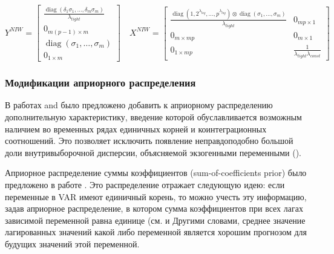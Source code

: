 \documentclass[11pt]{article} %
\DeclareMathOperator{\diag}{diag}
\begin{document}
\begin{equation}
Y^{NIW}=\begin{bmatrix}
\frac{\diag(\delta_1\sigma_1,\ldots, \delta_m\sigma_m)}{\lambda_{tight}}\\
0_{m(p-1)\times m}\\
\diag(\sigma_1,\ldots,\sigma_m)\\
0_{1\times m}
\end{bmatrix}
\quad
%
X^{NIW}=\begin{bmatrix}
\frac{\diag(1,2^{\lambda_{lag}},\ldots, p^{\lambda_{lag}})\otimes \diag(\sigma_1,\ldots,\sigma_m)}{\lambda_{tight}} & 0_{mp\times 1} \\
0_{m\times mp}&0_{m\times 1}\\
0_{1\times mp}&\frac{1}{\lambda_{tight}\lambda_{const}}
\end{bmatrix}\label{NIW_observations}
\end{equation}






\subsubsection*{Модификации априорного распределения}

В работах \cite{doan_al_1984} and \cite{sims_1993} было предложено добавить к априорному распределению дополнительную характеристику, введение которой обуславливается возможным наличием во временных рядах единичных корней и коинтеграционных  соотношений. Это позволяет исключить появление неправдоподобно большой доли внутривыборочной дисперсии, объясняемой экзогенными переменными (\cite{carriero_al_2015}). %

Априорное распределение суммы коэффициентов (sum-of-coefficients prior) было предложено в работе  \cite{doan_al_1984}. Это распределение отражает следующую идею: если переменные в VAR имеют единичный корень, то можно учесть эту информацию, задав априорное распределение, в котором сумма коэффициентов при всех лагах зависимой переменной равна единице (см. \cite{robertson_tallman_1999} и \cite{blake_mumtaz_2012} Другими словами, среднее значение лагированных значений какой либо переменной является хорошим прогнозом  для будущих значений этой переменной.
\end{document}
